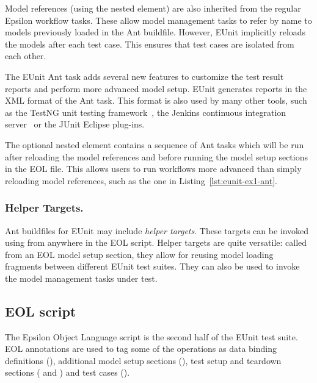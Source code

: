 Model references (using the  nested element) are also inherited from the regular Epsilon workflow tasks. These allow model management tasks to refer by name to models previously loaded in the Ant buildfile. However, EUnit implicitly reloads the models after each test case. This ensures that test cases are isolated from each other.

The EUnit Ant task adds several new features to customize the test result reports and perform more advanced model setup. EUnit generates reports in the XML format of the Ant  task. This format is also used by many other tools, such as the TestNG unit testing framework~\cite{TestNG}, the Jenkins continuous integration server~\cite{Jenkins} or the JUnit Eclipse plug-ins.

The optional  nested element contains a sequence of Ant tasks which will be run after reloading the model references and before running the model setup sections in the EOL file. This allows users to run workflows more advanced than simply reloading model references, such as the one in Listing~\ref{lst:eunit-ex1-ant}.

\subsubsection{Helper Targets.} Ant buildfiles for EUnit may include \emph{helper targets}. These targets can be invoked using  from anywhere in the EOL script. Helper targets are quite versatile: called from an EOL model setup section, they allow for reusing model loading fragments between different EUnit test suites. They can also be used to invoke the model management tasks under test.

\subsection{EOL script}
\label{sec:eunit-eol-script}

The Epsilon Object Language script is the second half of the EUnit test suite. EOL annotations are used to tag some of the operations as data binding definitions (), additional model setup sections (), test setup and teardown sections ( and ) and test cases ().

